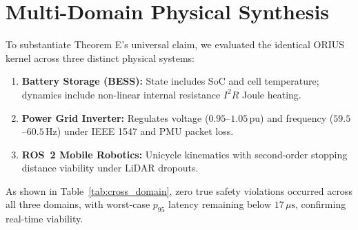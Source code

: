 \documentclass[conference]{IEEEtran}
\begin{document}
\section{Multi-Domain Physical Synthesis}
To substantiate Theorem E's universal claim, we evaluated the identical ORIUS kernel across three distinct physical systems:
\begin{enumerate}
    \item \textbf{Battery Storage (BESS):} State includes SoC and cell temperature; dynamics include non-linear internal resistance $I^2 R$ Joule heating.
    \item \textbf{Power Grid Inverter:} Regulates voltage ($0.95$--$1.05\,\text{pu}$) and frequency ($59.5$--$60.5\,\text{Hz}$) under IEEE 1547 and PMU packet loss.
    \item \textbf{ROS~2 Mobile Robotics:} Unicycle kinematics with second-order stopping distance viability under LiDAR dropouts.
\end{enumerate}

\begin{table}[ht]
\caption{Cross-Domain Physical Synthesis Results}
\label{tab:cross_domain}
\centering
{}
\end{table}

As shown in Table~\ref{tab:cross_domain}, zero true safety violations occurred across all three domains, with worst-case $p_{95}$ latency remaining below $17\,\mu\text{s}$, confirming real-time viability.
\end{document}

